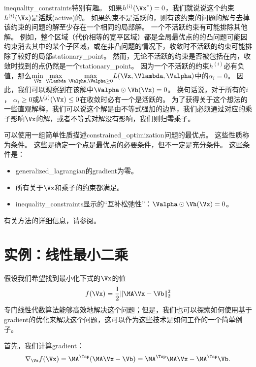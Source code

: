 \gls{inequality_constraints}特别有趣。
如果$h^{(i)}(\Vx^*)= 0$，我们就说说这个约束$h^{(i)}(\Vx)$是\textbf{活跃}(active)的。
如果约束不是活跃的，则有该约束的问题的解与去掉该约束的问题的解至少存在一个相同的局部解。
一个不活跃约束有可能排除其他解。
例如，整个区域（代价相等的宽平区域）都是全局最优点的的凸问题可能因约束消去其中的某个子区域，或在非凸问题的情况下，收敛时不活跃的约束可能排除了较好的局部\gls{stationary_point}。
然而，无论不活跃的约束是否被包括在内，收敛时找到的点仍然是一个\gls{stationary_point}。
因为一个不活跃的约束$h^{(i)}$必有负值，那么$
 \underset{\Vx}{\min}~  \underset{\Vlambda}{\max}~
 \underset{\Valpha, \Valpha \geq 0}{\max}   L(\Vx, \Vlambda, \Valpha) 
$中的$\alpha_i = 0$。
因此，我们可以观察到在该解中$\Valpha \odot \Vh(\Vx) = 0$。
换句话说，对于所有的$i$， $\alpha_i \geq 0$或$ h^{(j)}(\Vx) \leq 0$在收敛时必有一个是活跃的。
为了获得关于这个想法的一些直观解释，我们可以说这个解是由不等式强加的边界，我们必须通过对应的乘子影响$\Vx$的解，或者不等式对解没有影响，我们则归零乘子。

可以使用一组简单性质描述\gls{constrained_optimization}问题的最优点。
这些性质称为条件\citep{Karush39,kuhn1951}。
这些是确定一个点是最优点的必要条件，但不一定是充分条件。
这些条件是：
\begin{itemize}
 \item \gls{generalized_lagrangian}的\gls{gradient}为零。
 \item 所有关于$\Vx$和乘子的约束都满足。
 \item \gls{inequality_constraints}显示的``互补松弛性''：$\Valpha \odot \Vh(\Vx) = 0$。
\end{itemize}
有关方法的详细信息，请参阅\cite{NumOptBook}。


\section{实例：线性最小二乘}
\label{sec:example_linear_least_squares}
假设我们希望找到最小化下式的$\Vx$的值
\begin{align}
 f(\Vx) = \frac{1}{2}\| \MA \Vx - \Vb \|_2^2
\end{align}
专门线性代数算法能够高效地解决这个问题；但是，我们也可以探索如何使用基于\gls{gradient}的优化来解决这个问题，这可以作为这些技术是如何工作的一个简单例子。

首先，我们计算\gls{gradient}：
\begin{align}
 \nabla_{\Vx} f(\Vx) = \MA^\Tsp (\MA \Vx - \Vb) = \MA^\Tsp \MA \Vx - \MA^\Tsp \Vb .
\end{align}


